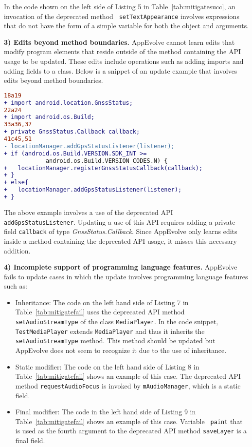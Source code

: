 In the code shown on the left side of Listing 5 in
Table~\ref{tab:mitigatesucc}, an invocation of the deprecated method {\tt
setTextAppearance} involves expressions that do not have the form
of a simple variable for both the object and arguments.

\vspace{0.25\baselineskip}\noindent\textbf{3) Edits beyond method boundaries.} AppEvolve cannot learn edits that modify program elements that reside outside of the method containing the API usage to be updated. These edits include operations such as adding imports and adding fields to a class. Below is a snippet of an update example that involves edits beyond method boundaries.
\begin{lstlisting}[language=diff,numbers=none]
18a19
+ import android.location.GnssStatus;
22a24
+ import android.os.Build;
33a36,37
+ private GnssStatus.Callback callback;
41c45,51
- locationManager.addGpsStatusListener(listener);
+ if (android.os.Build.VERSION.SDK_INT >=
            android.os.Build.VERSION_CODES.N) {
+   locationManager.registerGnssStatusCallback(callback);
+ }
+ else{
+   locationManager.addGpsStatusListener(listener);
+ }
\end{lstlisting}
The above example involves a use of the deprecated API {\tt
addGpsStatusListener}. Updating a use of this API requires adding a private
field {\tt callback} of type {\em GnssStatus.Callback}.
Since AppEvolve only learns edits inside a method containing the deprecated
API usage, it misses this necessary addition.

\vspace{0.25\baselineskip}\noindent\textbf{4) Incomplete support of programming language features.} AppEvolve fails to update cases in which the update involves programming language features such as:
\begin{itemize}
\item Inheritance: The code on the left hand side of Listing 7 in
Table~\ref{tab:mitigatefail} uses the deprecated API method {\tt
set\-Audio\-Stream\-Type} of the class {\tt MediaPlayer}. In the code snippet,
{\tt Test\-Media\-Player} extends {\tt MediaPlayer} and thus it inherits
the {\tt setAudioStreamType} method. This method should be updated but
AppEvolve does not seem to recognize it due to the use of inheritance.
\item Static modifier:  The code on the left hand side of Listing 8 in
Table~\ref{tab:mitigatefail} shows an example of this case.  The deprecated
API method {\tt requestAudioFocus} is invoked by {\tt mAudioManager}, which
is a static field.

\item Final modifier: The code in the left hand side of Listing 9 in
Table~\ref{tab:mitigatefail} shows an example of this case.  Variable {\tt
paint} that is used as the fourth argument to the deprecated API method
{\tt saveLayer} is a final field.

\end{itemize}

